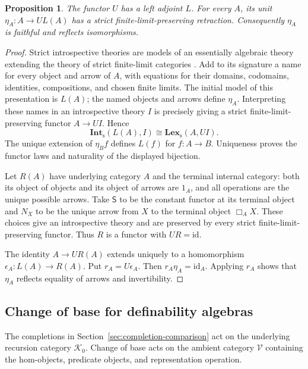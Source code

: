 \documentclass[11pt]{article}
\newtheorem{proposition}[theorem]{Proposition}
\theoremstyle{definition}
\theoremstyle{remark}
\begin{document}
\begin{proposition}\label{prop:free-introspective-extension}
The functor $U$ has a left adjoint $L$. For every $A$, its unit
$\eta_A:A\to UL(A)$ has a strict finite-limit-preserving retraction.
Consequently $\eta_A$ is faithful and reflects isomorphisms.
\end{proposition}
\begin{proof}
Strict introspective theories are models of an essentially algebraic
theory extending the theory of strict finite-limit categories
\cite[p.~94]{Ramesh}. Add to its signature a name for every object
and arrow of $A$, with equations for their domains, codomains,
identities, compositions, and chosen finite limits. The initial model
of this presentation is $L(A)$; the named objects and arrows define
$\eta_A$. Interpreting these names in an introspective theory $I$
is precisely giving a strict finite-limit-preserving functor
$A\to UI$. Hence
\[
 \mathbf{Int}_{\mathrm{s}}(L(A),I)
 \cong\mathbf{Lex}_{\mathrm{s}}(A,UI).
\]
The unique extension of $\eta_Bf$ defines $L(f)$ for
$f:A\to B$. Uniqueness proves the functor laws and naturality of
the displayed bijection.

Let $R(A)$ have underlying category $A$ and the terminal internal
category: both its object of objects and its object of arrows are
$1_A$, and all operations are the unique possible arrows. Take $\mathsf S$
to be the constant functor at its terminal object and $N_X$ to be
the unique arrow from $X$ to the terminal object $\Box_A X$.
These choices give an introspective theory and are preserved by
every strict finite-limit-preserving functor. Thus $R$ is a functor
with $UR=\mathrm{id}$.

The identity $A\to UR(A)$ extends uniquely to a homomorphism
$\epsilon_A:L(A)\to R(A)$. Put $r_A=U\epsilon_A$. Then
$r_A\eta_A=\mathrm{id}_A$. Applying $r_A$ shows that $\eta_A$
reflects equality of arrows and invertibility.
\end{proof}

\subsection{Change of base for definability algebras}
\label{sec:definability-base-change}

The completions in Section~\ref{sec:completion-comparison} act on
the underlying recursion category $\mathcal K_0$. Change of base
acts on the ambient category $\mathscr V$ containing the hom-objects,
predicate objects, and representation operation.
\end{document}
